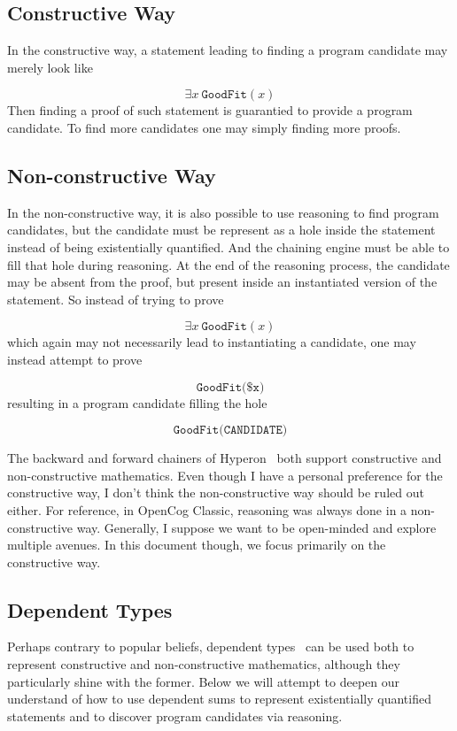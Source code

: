 \documentclass[]{report}
\begin{document}
\subsection{Constructive Way}

In the constructive way, a statement leading to finding a program
candidate may merely look like

$$\exists x\ \texttt{GoodFit}(x)$$ Then finding a proof of such
statement is guarantied to provide a program candidate.  To find more
candidates one may simply finding more proofs.

\subsection{Non-constructive Way}

In the non-constructive way, it is also possible to use reasoning to
find program candidates, but the candidate must be represent as a hole
inside the statement instead of being existentially quantified.  And
the chaining engine must be able to fill that hole during reasoning.
At the end of the reasoning process, the candidate may be absent from
the proof, but present inside an instantiated version of the
statement.  So instead of trying to prove

$$\exists x\ \texttt{GoodFit}(x)$$ which again may not necessarily
lead to instantiating a candidate, one may instead attempt to prove

$$\texttt{GoodFit(\$x)}$$ resulting in a program candidate filling the
hole

$$\texttt{GoodFit(CANDIDATE)}$$

The backward and forward chainers of Hyperon~\cite{TODO} both support
constructive and non-constructive mathematics.  Even though I have a
personal preference for the constructive way, I don't think the
non-constructive way should be ruled out either.  For reference, in
OpenCog Classic, reasoning was always done in a non-constructive way.
Generally, I suppose we want to be open-minded and explore multiple
avenues.  In this document though, we focus primarily on the
constructive way.

\subsection{Dependent Types}
Perhaps contrary to popular beliefs, dependent types~\cite{TODO} can
be used both to represent constructive and non-constructive
mathematics, although they particularly shine with the former.  Below
we will attempt to deepen our understand of how to use dependent sums
to represent existentially quantified statements and to discover
program candidates via reasoning.
\end{document}
